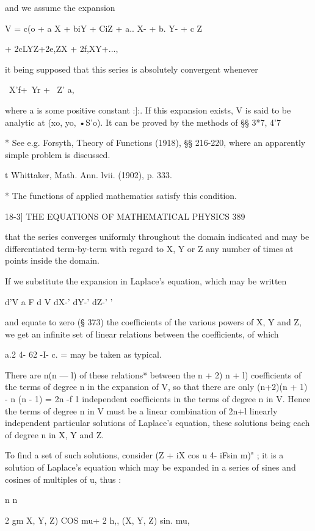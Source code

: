 and we assume the expansion 

V = c(o + a X + biY + CiZ + a.. X- + b. Y- + c  Z  

+ 2cLYZ+2e,ZX + 2f,XY+..., 

it being supposed that this series is absolutely convergent whenever 

\ X'f+\ Yr + \ Z'  a, 

where a is some positive constant :]:. If this expansion exists, V is said to 
be analytic at (xo, yo, •S'o). It can be proved by the methods of §§ 3*7, 4'7 

* See e.g. Forsyth, Theory of Functions (1918), §§ 216-220, where an apparently simple 
problem is discussed. 

t Whittaker, Math. Ann. lvii. (1902), p. 333. 

* The functions of applied mathematics satisfy this condition. 



18-3] THE EQUATIONS OF MATHEMATICAL PHYSICS 389 

that the series converges uniformly throughout the domain indicated and 
may be differentiated term-by-term with regard to X, Y or Z any number of 
times at points inside the domain. 

If we substitute the expansion in Laplace's equation, which may be 
written 

d'V a F d V   
dX-' dY-' dZ-' ' 

and equate to zero (§ 373) the coefficients of the various powers of X, Y 
and Z, we get an infinite set of linear relations between the coefficients, 
of which 

a.2 4- 62 -I- c. = 
may be taken as typical. 

There are  n(n — l) of these relations* between the   n + 2) n + l) 
coefficients of the terms of degree n in the expansion of V, so that there 
are only  (n+2)(n + 1) - n (n - 1) = 2n -f 1 independent coefficients in 
the terms of degree n in V. Hence the terms of degree n in V must be 
a linear combination of 2n+l linearly independent particular solutions of 
Laplace's equation, these solutions being each of degree n in X, Y and Z. 

To find a set of such solutions, consider (Z + iX cos u 4- iFsin m)" ; it is 
a solution of Laplace's equation which may be expanded in a series of sines 
and cosines of multiples of u, thus : 

n n 

2 gm X, Y, Z) COS mu+ 2 h,, (X, Y, Z) sin. mu, 

